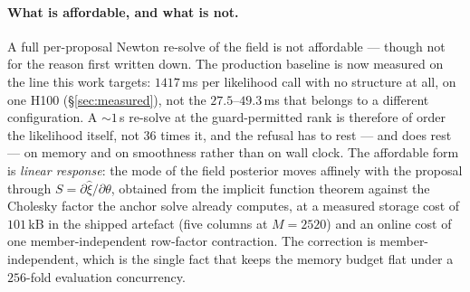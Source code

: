\documentclass[11pt]{article}
\theoremstyle{definition}
\theoremstyle{remark}
\begin{document}
\paragraph{What is affordable, and what is not.} A full per-proposal Newton
re-solve of the field is not affordable --- though not for the reason first
written down. The production baseline is now measured on the line this work
targets: $1417$\,ms per likelihood call with no structure at all, on one H100
(\S\ref{sec:measured}), not the $27.5$--$49.3$\,ms that belongs to a different
configuration. A $\sim1$\,s re-solve at the guard-permitted rank is therefore of
order the likelihood itself, not $36$ times it, and the refusal has to rest ---
and does rest --- on memory and on smoothness rather than on wall clock. The
affordable form is \emph{linear response}: the mode of the field posterior moves
affinely with the proposal through $S=\partial\hat\xi/\partial\theta$, obtained
from the implicit function theorem against the Cholesky factor the anchor solve
already computes, at a measured storage cost of $101$\,kB in the shipped
artefact (five columns at $M=2520$) and an online cost of one member-independent
row-factor contraction. The correction is member-independent, which is the single
fact that keeps the memory budget flat under a $256$-fold evaluation concurrency.
\end{document}
